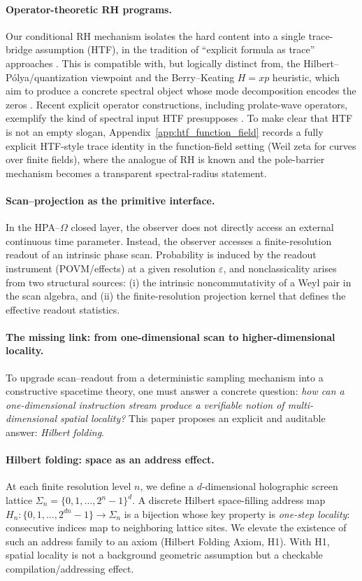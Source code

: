 \paragraph{Operator-theoretic RH programs.}
Our conditional RH mechanism isolates the hard content into a single trace-bridge assumption (HTF), in the tradition of ``explicit formula as trace'' approaches \cite{Connes1999}.
This is compatible with, but logically distinct from, the Hilbert--P\'olya/quantization viewpoint and the Berry--Keating $H=xp$ heuristic, which aim to produce a concrete spectral object whose mode decomposition encodes the zeros \cite{BerryKeating1999}.
Recent explicit operator constructions, including prolate-wave operators, exemplify the kind of spectral input HTF presupposes \cite{ConnesConsaniMoscovici2024}.
To make clear that HTF is not an empty slogan, Appendix~\ref{app:htf_function_field} records a fully explicit HTF-style trace identity in the function-field setting (Weil zeta for curves over finite fields), where the analogue of RH is known and the pole-barrier mechanism becomes a transparent spectral-radius statement.

\paragraph{Scan--projection as the primitive interface.}
In the HPA--$\Omega$ closed layer, the observer does not directly access an external continuous time parameter.
Instead, the observer accesses a finite-resolution readout of an intrinsic phase scan.
Probability is induced by the readout instrument (POVM/effects) at a given resolution $\varepsilon$, and nonclassicality arises from two structural sources:
(i) the intrinsic noncommutativity of a Weyl pair in the scan algebra, and
(ii) the finite-resolution projection kernel that defines the effective readout statistics.

\paragraph{The missing link: from one-dimensional scan to higher-dimensional locality.}
To upgrade scan--readout from a deterministic sampling mechanism into a constructive spacetime theory, one must answer a concrete question:
\emph{how can a one-dimensional instruction stream produce a verifiable notion of multi-dimensional spatial locality?}
This paper proposes an explicit and auditable answer: \emph{Hilbert folding}.

\paragraph{Hilbert folding: space as an address effect.}
At each finite resolution level $n$, we define a $d$-dimensional holographic screen lattice $\Sigma_n=\{0,1,\dots,2^n-1\}^d$.
A discrete Hilbert space-filling address map $H_n:\{0,1,\dots,2^{dn}-1\}\to\Sigma_n$ is a bijection whose key property is \emph{one-step locality}:
consecutive indices map to neighboring lattice sites.
We elevate the existence of such an address family to an axiom (Hilbert Folding Axiom, H1).
With H1, spatial locality is not a background geometric assumption but a checkable compilation/addressing effect.

